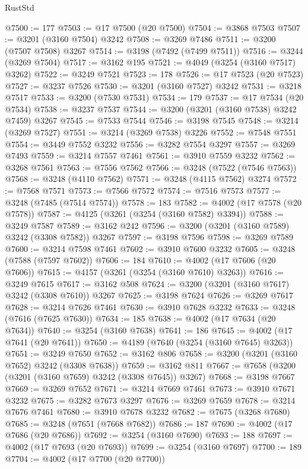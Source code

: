 \begin{lexlean}{RustStd}
\begin{coremodule}
{\begin{coremodule}
{{{{{{{{{{{{{{{{{{{{{{{{{@7500 := 177
@7503 := @17 @7500 (@20 @7500)
@7504 := @3868 @7503
@7507 := @3201 (@3160 @7504) @3242
@7508 := @3269 @7486
@7511 := @3200 (@7507 @7508) @3267
@7514 := @3198 (@7492 (@7499 @7511))
@7516 := @3244 (@3269 @7504)
@7517 := @3162 @195
@7521 := @4049 (@3254 (@3160 @7517) @3262)
@7522 := @3249 @7521
@7523 := 178
@7526 := @17 @7523 (@20 @7523)
@7527 := @3237 @7526
@7530 := @3201 (@3160 @7527) @3242
@7531 := @3218 @7517
@7533 := @3200 (@7530 @7531)
@7534 := 179
@7537 := @17 @7534 (@20 @7534)
@7538 := @3237 @7537
@7544 := @3200 (@3201 (@3160 @7538) @3242 @7459) @3267
@7545 := @7533 @7544
@7546 := @3198 @7545
@7548 := @3214 (@3269 @7527)
@7551 := @3214 (@3269 @7538) @3226
@7552 := @7548 @7551
@7554 := @3449 @7552 @3232
@7556 := @3282 @7554 @3297
@7557 := @3269 @7493
@7559 := @3214 @7557 @7461
@7561 := @3910 @7559 @3232
@7562 := @3268 @7561
@7563 := @7556 @7562
@7566 := @3248 (@7522 (@7546 @7563))
@7568 := @3248 (@4110 @7562)
@7571 := @3248 (@4115 @7562) @3274
@7572 := @7568 @7571
@7573 := @7566 @7572
@7574 := @7516 @7573
@7577 := @3248 (@7485 (@7514 @7574))
@7578 := 183
@7582 := @4002 (@17 @7578 (@20 @7578))
@7587 := @4125 (@3261 (@3254 (@3160 @7582) @3394))
@7588 := @3249 @7587
@7589 := @3162 @242
@7596 := @3200 (@3201 (@3160 @7589) @3242 (@3308 @7582)) @3267
@7597 := @3198 @7596
@7598 := @3269 @7589
@7600 := @3214 @7598 @7461
@7602 := @3910 @7600 @3232
@7605 := @3248 (@7588 (@7597 @7602))
@7606 := 184
@7610 := @4002 (@17 @7606 (@20 @7606))
@7615 := @4157 (@3261 (@3254 (@3160 @7610) @3263))
@7616 := @3249 @7615
@7617 := @3162 @508
@7624 := @3200 (@3201 (@3160 @7617) @3242 (@3308 @7610)) @3267
@7625 := @3198 @7624
@7626 := @3269 @7617
@7628 := @3214 @7626 @7461
@7630 := @3910 @7628 @3232
@7633 := @3248 (@7616 (@7625 @7630))
@7634 := 185
@7638 := @4002 (@17 @7634 (@20 @7634))
@7640 := @3254 (@3160 @7638)
@7641 := 186
@7645 := @4002 (@17 @7641 (@20 @7641))
@7650 := @4189 (@7640 (@3254 (@3160 @7645) @3263))
@7651 := @3249 @7650
@7652 := @3162 @806
@7658 := @3200 (@3201 (@3160 @7652) @3242 (@3308 @7638))
@7659 := @3162 @811
@7667 := @7658 (@3200 (@3201 (@3160 @7659) @3242 (@3308 @7645)) @3267)
@7668 := @3198 @7667
@7669 := @3269 @7652
@7671 := @3214 @7669 @7461
@7673 := @3910 @7671 @3232
@7675 := @3282 @7673 @3297
@7676 := @3269 @7659
@7678 := @3214 @7676 @7461
@7680 := @3910 @7678 @3232
@7682 := @7675 (@3268 @7680)
@7685 := @3248 (@7651 (@7668 @7682))
@7686 := 187
@7690 := @4002 (@17 @7686 (@20 @7686))
@7692 := @3254 (@3160 @7690)
@7693 := 188
@7697 := @4002 (@17 @7693 (@20 @7693))
@7699 := @3254 (@3160 @7697)
@7700 := 189
@7704 := @4002 (@17 @7700 (@20 @7700))
}}}}}}}}}}}}}}}}}}}}}}}}}
\end{coremodule}}
\end{coremodule}
\end{lexlean}
